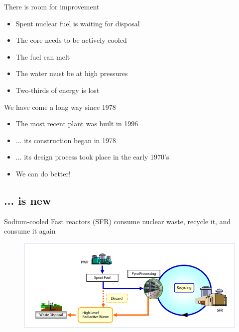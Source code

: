 \documentclass{beamer}
\begin{document}
        \begin{frame}{There is room for improvement}
            \begin{itemize}
                \item Spent nuclear fuel is waiting for disposal
                \pause
                \item The core needs to be actively cooled
                \pause
                \item The fuel can melt
                \pause
                \item The water must be at high pressures
                \pause
                \item Two-thirds of energy is lost
            \end{itemize}
        \end{frame}

        \begin{frame}{We have come a long way since 1978}
            \begin{itemize}
                \item The most recent plant was built in 1996
                \pause
                \item ... its construction began in 1978
                \pause
                \item ... its design process took place in the early 1970's
                \pause
                \item We can do better!
            \end{itemize}
        \end{frame}

    \subsection{... is new}

        \begin{frame}{Sodium-cooled Fast reactors (SFR) consume nuclear waste, recycle it, and consume it again}
            \begin{figure}
                \centering
                \includegraphics[width=1.0\textwidth]{./img/fastCycle.png}
                \caption*{}
            \end{figure}
        \end{frame}
\end{document}
